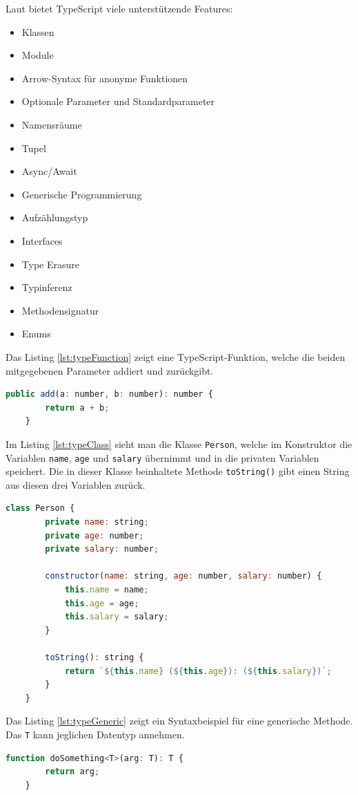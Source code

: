 Laut \autocite{wikiTypeScript} bietet TypeScript viele unterstützende Features:
\begin{itemize}
	\item Klassen
	\item Module
	\item Arrow-Syntax für anonyme Funktionen
	\item Optionale Parameter und Standardparameter
	\item Namensräume
	\item Tupel
	\item Async/Await
	\item Generische Programmierung
	\item Aufzählungstyp
	\item Interfaces
	\item Type Erasure
	\item Typinferenz
	\item Methodensignatur
	\item Enums
\end{itemize}
Das Listing \ref{lst:typeFunction} zeigt eine TypeScript-Funktion, welche die beiden mitgegebenen Parameter addiert und zurückgibt.
\begin{lstlisting}[caption={TypeScript-Beispiel Function}, language=JavaScript, label={lst:typeFunction}]
	public add(a: number, b: number): number {
		return a + b;
	}
\end{lstlisting}
Im Listing \ref{lst:typeClass} sieht man die Klasse \texttt{Person}, welche im Konstruktor die Variablen \texttt{name}, \texttt{age} und \texttt{salary} übernimmt und in die privaten Variablen speichert. Die in dieser Klasse beinhaltete Methode \texttt{toString()} gibt einen String aus diesen drei Variablen zurück.
\begin{lstlisting}[caption={TypeScript-Beispiel Klasse},captionpos=b, language=JavaScript, label={lst:typeClass}]
	class Person {
		private name: string;
		private age: number;
		private salary: number;
		
		constructor(name: string, age: number, salary: number) {
			this.name = name;
			this.age = age;
			this.salary = salary;
		}
		
		toString(): string {
			return `${this.name} (${this.age}): (${this.salary})`;
		}
	}
\end{lstlisting}
Das Listing \ref{lst:typeGeneric} zeigt ein Syntaxbeispiel für eine generische Methode. Das \texttt{T} kann jeglichen Datentyp annehmen.
\begin{lstlisting}[caption={TypeScript-Beispiel Generische Programmierung}, language=JavaScript, label={lst:typeGeneric}]
	function doSomething<T>(arg: T): T {
		return arg;
	}
\end{lstlisting}


